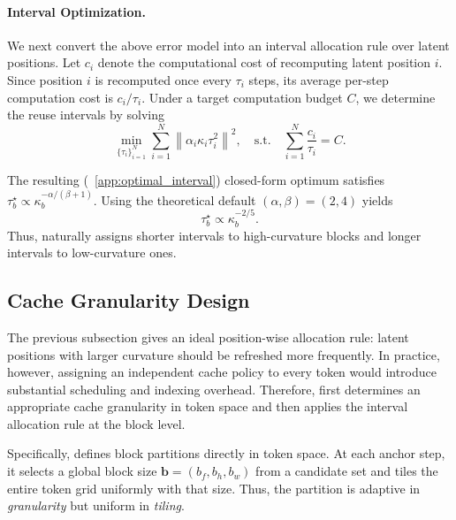 \paragraph{\textbf{Interval Optimization.}}
We next convert the above error model into an interval allocation rule
over latent positions. Let $c_i$ denote the computational cost of
recomputing latent position $i$. Since position $i$ is recomputed once
every $\tau_i$ steps, its average per-step computation cost is
$c_i / \tau_i$. Under a target computation budget $C$, we determine the
reuse intervals by solving
\begin{equation}
    \min_{\{\tau_i\}_{i=1}^{N}}
    \sum_{i=1}^{N}
     \left\|\alpha_i \kappa_i \tau_i^2\right\|^2,
    \quad
    \mathrm{s.t.}
    \quad
    \sum_{i=1}^{N}
    \frac{c_i}{\tau_i}
    =
    C .
    \label{eq:interval_optimization_position}
\end{equation}

The resulting (~\ref{app:optimal_interval}) closed-form optimum satisfies $\tau_b^\star \propto \kappa_b^{-\alpha/(\beta+1)}.$
Using the theoretical default $(\alpha,\beta)=(2,4)$ yields
\begin{equation}
    \tau_b^\star \propto \kappa_b^{-2/5}.
\end{equation}
Thus, \cubic naturally assigns shorter intervals to high-curvature blocks and longer intervals to low-curvature ones.

\subsection{Cache Granularity Design}
\label{sec:partitioner}

The previous subsection gives an ideal position-wise allocation rule:
latent positions with larger curvature should be refreshed more
frequently. In practice, however,
assigning an independent cache policy to every token would introduce
substantial scheduling and indexing overhead. Therefore, \cubic first
determines an appropriate cache granularity in token space and then
applies the interval allocation rule at the block level.

Specifically, \cubic defines block partitions directly in token space. At each anchor step, it selects a global block size $\mathbf{b}=(b_f,b_h,b_w)$ from a candidate set and tiles the entire token grid uniformly with that size. Thus, the partition is adaptive in \emph{granularity} but uniform in \emph{tiling}.

